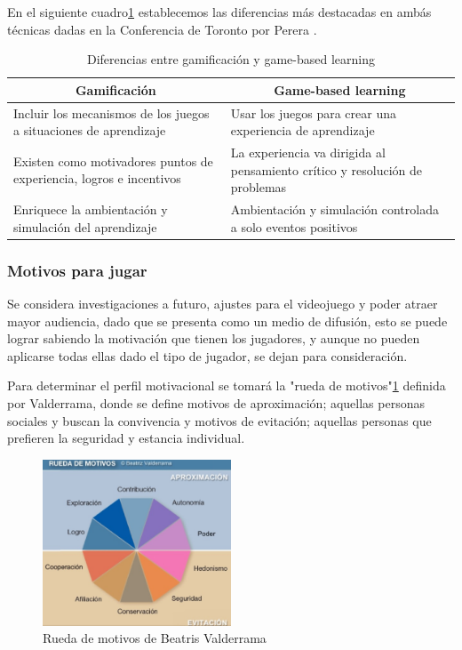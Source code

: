En el siguiente cuadro\ref{gabale} establecemos las diferencias más destacadas en ambás técnicas dadas en la Conferencia de Toronto por Perera \cite{jorgepereragonzalez2016}.

\begin{table}[htbp]
	\centering
	\caption{Diferencias entre gamificación y game-based learning}
	\label{gabale}
\begin{tabular}{|l|l|}
	\hline
	\multicolumn{1}{|c|}{\textbf{Gamificación}}                         & \multicolumn{1}{c|}{\textbf{Game-based learning}}                           \\ \hline
	Incluir los mecanismos de los juegos a situaciones de aprendizaje   & Usar los juegos para crear una experiencia de aprendizaje                   \\ \hline
	Existen como motivadores puntos de experiencia, logros e incentivos & La experiencia va dirigida al pensamiento crítico y resolución de problemas \\ \hline
	Enriquece la ambientación y simulación del aprendizaje              & Ambientación y simulación controlada a solo eventos positivos               \\ \hline
\end{tabular}
\end{table}

\subsubsection{Motivos para jugar}
Se considera investigaciones a futuro, ajustes para el videojuego y poder atraer mayor audiencia, dado que se presenta como un medio de difusión, esto se puede lograr sabiendo la motivación que tienen los jugadores, y aunque no pueden aplicarse todas ellas dado el tipo de jugador, se dejan para consideración.

Para determinar el perfil motivacional se tomará la "rueda de motivos"\ref{fig:rm} definida por Valderrama\cite{valde}, donde se define motivos de aproximación; aquellas personas sociales y buscan la convivencia y motivos de evitación; aquellas personas que prefieren la seguridad y estancia individual.
\begin{figure}
	\centering
	\caption{Rueda de motivos de Beatris Valderrama}
	\label{fig:rm}
	\includegraphics[width=0.5\textwidth]{02Antecedentes/contribucionesR/imagenes/rueda-de-motivos}
\end{figure}

